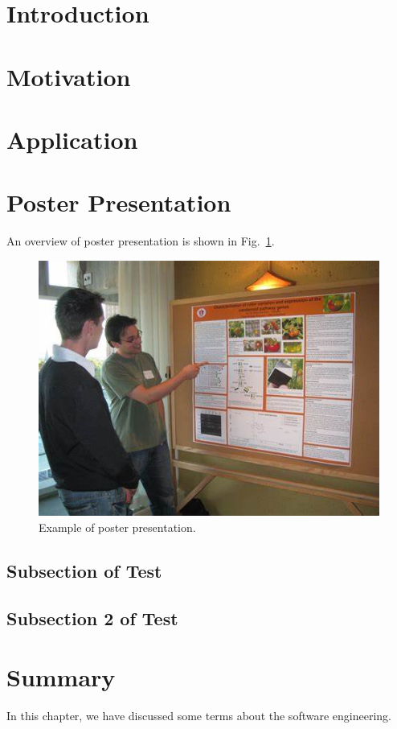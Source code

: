 \section{Introduction}
\lipsum[7-8] 

\section{Motivation}
\lipsum[4-5]

\section{Application}
\lipsum[4-5]

\section{Poster Presentation}
\lipsum[1-1]
An overview of poster presentation is shown in Fig.~\ref{fig:poster_presentation}.

\begin{figure}[H]
\centering
  \includegraphics[width=\linewidth]{Figures/poster.jpg}
  \caption{Example of poster presentation.}
  \label{fig:poster_presentation}
\end{figure}

\subsection{Subsection of Test}
\lipsum[1-2]
\subsection{Subsection 2 of Test}
\lipsum[1-2]

\section{Summary}
In this chapter, we have discussed some terms about the software engineering.
